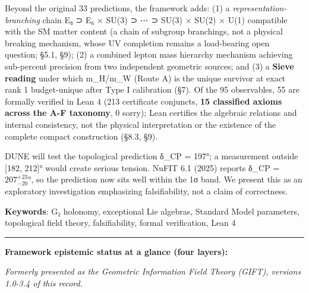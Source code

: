 \documentclass[11pt,a4paper]{article}
\begin{document}
Beyond the original 33 predictions, the framework adds: (1) a \emph{representation-branching} chain E₈ ⊃ E₆ × SU(3) ⊃ ⋯ ⊃ SU(3) × SU(2) × U(1) compatible with the SM matter content (a chain of subgroup branchings, not a physical breaking mechanism, whose UV completion remains a load-bearing open question; §5.1, §9); (2) a combined lepton mass hierarchy mechanism achieving sub-percent precision from two independent geometric sources; and (3) a \textbf{Sieve reading} under which m\_\allowbreak{}H/m\_\allowbreak{}W (Route A) is the unique survivor at exact rank 1 budget-unique after Type I calibration (§7). Of the 95 observables, 55 are formally verified in Lean 4 (213 certificate conjuncts, \textbf{15 classified axioms across the A-F taxonomy}, 0 sorry); Lean certifies the algebraic relations and internal consistency, not the physical interpretation or the existence of the complete compact construction (§8.3, §9).

DUNE will test the topological prediction δ\_\allowbreak{}CP = 197°; a measurement outside {[}182, 212{]}° would create serious tension. NuFIT 6.1 (2025) reports δ\_\allowbreak{}CP = \(207^{+23}_{-20}\)°, so the prediction now sits well within the 1σ band. We present this as an exploratory investigation emphasizing falsifiability, not a claim of correctness.

\textbf{Keywords}: G₂ holonomy, exceptional Lie algebras, Standard Model parameters, topological field theory, falsifiability, formal verification, Lean 4

\newpage
\setcounter{tocdepth}{1}
\tableofcontents
\newpage

\begin{center}\rule{\linewidth}{0.5pt}\end{center}

\textbf{Framework epistemic status at a glance (four layers):}

\emph{Formerly presented as the Geometric Information Field Theory (GIFT), versions 1.0-3.4 of this record.}
\end{document}
